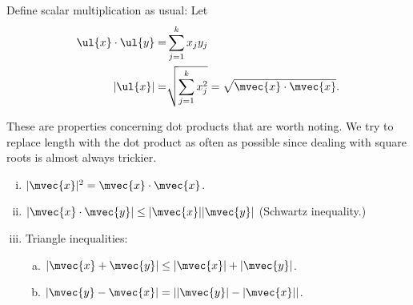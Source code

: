 \medskip

Define scalar multiplication as usual: Let 
\begin{align*}
	\ul{x}\cdot\ul{y}=&\sum_{j=1}^{k}x_jy_j\\
	|\ul{x}|=&\sqrt{\sum_{j=1}^k x_j^2}=\sqrt{\mvec{x}\cdot\mvec{x}}.
\end{align*}
\begin{property}
	These are properties concerning dot products that are worth noting. We try to replace length with the dot product as often as possible since dealing with square roots is almost always trickier.
	\begin{enumerate}[(i)]
		\item \(|\mvec{x}|^2=\mvec{x}\cdot\mvec{x}\).
		
		\item \(|\mvec{x}\cdot\mvec{y}|\leq|\mvec{x}||\mvec{y}|\) (Schwartz inequality.)
		
		\item Triangle inequalities:
		\begin{enumerate}[(a)]
			\item \(|\mvec{x}+\mvec{y}|\leq |\mvec{x}|+|\mvec{y}|\).
			
			\item \(|\mvec{y}-\mvec{x}|=||\mvec{y}|-|\mvec{x}||\).
		\end{enumerate}
	\end{enumerate}
\end{property}
